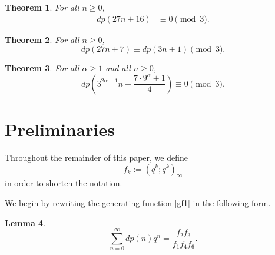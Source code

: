 \documentclass{amsart}
\newtheorem{theorem}{Theorem}[section]
\newtheorem{lemma}[theorem]{Lemma}
\begin{document}
\begin{theorem}
For all $n \geq 0$,
\begin{align}
dp(27n+16) & \equiv 0 \pmod{3}.
\label{c2}
\end{align}
\label{Th3}
\end{theorem}

\begin{theorem}
For all $n \geq 0$,
\begin{equation*}
dp(27n+7) \equiv dp(3n+1) \pmod{3}.
\end{equation*}
\label{internal_cong}
\end{theorem}

\begin{theorem}
For all $\alpha \geq 1$ and all $n \geq  0$,
\begin{equation*}
    dp \left( 3^{2\alpha + 1}n + \frac{7 \cdot 9^\alpha + 1}{4} \right) \equiv 0 \pmod{3}.
\end{equation*}
\label{Th4}
\end{theorem}

	







\section{Preliminaries}

Throughout the remainder of this paper, we define 
		$$f_k := (q^k;q^k)_{\infty}$$
in order to shorten the notation.

We begin by rewriting the generating function \eqref{gf1} in the following form.

\begin{lemma}
\begin{equation}
\sum_{n=0}^{\infty} dp(n)q^n = \frac{f_2f_3}{f_1f_4f_6}.
\label{gf2}
\end{equation}
\end{lemma}
\end{document}
